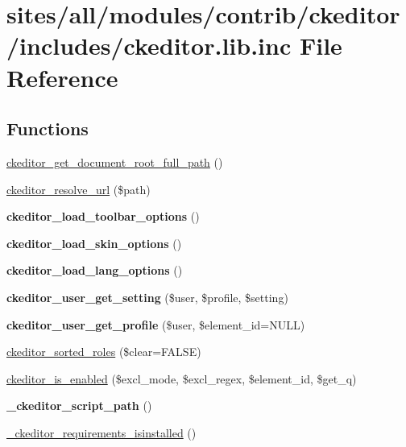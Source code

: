 \hypertarget{ckeditor_8lib_8inc}{
\section{sites/all/modules/contrib/ckeditor/includes/ckeditor.lib.inc File Reference}
\label{ckeditor_8lib_8inc}
}
\subsection*{Functions}
\begin{CompactItemize}
\item 
\hyperlink{ckeditor_8lib_8inc_2b8784ee84340eb14aa10e274f660fa6}{ckeditor\_\-get\_\-document\_\-root\_\-full\_\-path} ()
\item 
\hyperlink{ckeditor_8lib_8inc_7514d6bcd3e03a13ed52165fabe52b7b}{ckeditor\_\-resolve\_\-url} (\$path)
\item 
\hypertarget{ckeditor_8lib_8inc_5f672801bf692cf2a3d6262b747fc7b2}{
\textbf{ckeditor\_\-load\_\-toolbar\_\-options} ()}
\label{ckeditor_8lib_8inc_5f672801bf692cf2a3d6262b747fc7b2}

\item 
\hypertarget{ckeditor_8lib_8inc_8d8983a3d80ff70e5e608bb383648d65}{
\textbf{ckeditor\_\-load\_\-skin\_\-options} ()}
\label{ckeditor_8lib_8inc_8d8983a3d80ff70e5e608bb383648d65}

\item 
\hypertarget{ckeditor_8lib_8inc_75035a09802d9960a9c2428ee5417ee4}{
\textbf{ckeditor\_\-load\_\-lang\_\-options} ()}
\label{ckeditor_8lib_8inc_75035a09802d9960a9c2428ee5417ee4}

\item 
\hypertarget{ckeditor_8lib_8inc_cf0f078d0c407310a91c1a11c44826fb}{
\textbf{ckeditor\_\-user\_\-get\_\-setting} (\$user, \$profile, \$setting)}
\label{ckeditor_8lib_8inc_cf0f078d0c407310a91c1a11c44826fb}

\item 
\hypertarget{ckeditor_8lib_8inc_e46ef41a87e218b4eb67486ea335a84c}{
\textbf{ckeditor\_\-user\_\-get\_\-profile} (\$user, \$element\_\-id=NULL)}
\label{ckeditor_8lib_8inc_e46ef41a87e218b4eb67486ea335a84c}

\item 
\hyperlink{ckeditor_8lib_8inc_e4ce1fe78d83986dc783082a58964b7f}{ckeditor\_\-sorted\_\-roles} (\$clear=FALSE)
\item 
\hyperlink{ckeditor_8lib_8inc_5d7f963bc08132ffd4cb55061e4e8a21}{ckeditor\_\-is\_\-enabled} (\$excl\_\-mode, \$excl\_\-regex, \$element\_\-id, \$get\_\-q)
\item 
\hypertarget{ckeditor_8lib_8inc_de573f32c1840010e30f97e196ccb614}{
\textbf{\_\-ckeditor\_\-script\_\-path} ()}
\label{ckeditor_8lib_8inc_de573f32c1840010e30f97e196ccb614}

\item 
\hyperlink{ckeditor_8lib_8inc_cdfac606bf0b63be4bbdd3e0fd985eda}{\_\-ckeditor\_\-requirements\_\-isinstalled} ()
\end{CompactItemize}


